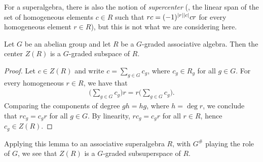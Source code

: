 \begin{remark}
    For a superalgebra, there is also the notion of \emph{supercenter} (\ie, the linear span of the set of homogeneous elements $c \in R$ such that $rc = (-1)^{|r||c|} cr$ for every homogeneous element $r \in R$), but this is not what we are considering here.
\end{remark}



\begin{lemma}\label{lemma:center-is-graded}
    Let $G$ be an abelian group and let $R$ be a $G$-graded associative algebra.
    Then the center $Z(R)$ is a $G$-graded subspace of $R$. 
\end{lemma}

\begin{proof}
    Let $c \in Z(R)$ and write $c = \sum_{g\in G} c_g$, where $c_g \in R_g$ for all $g \in G$.
    For every homogeneous $r \in R$, we have that
    \begin{align*}
        \big(\sum_{g\in G} c_g\big)r = r \big(\sum_{g\in G} c_g\big).
    \end{align*}
    Comparing the components of degree $gh = hg$, where $h = \deg r$, we conclude that $rc_g = c_g r$ for all $g \in G$. 
    By linearity, $r c_g = c_g r$ for all $r\in R$, hence $c_g \in Z(R)$.
\end{proof}

Applying this lemma to an associative superalgebra $R$, with $G^\#$ playing the role of $G$, we see that $Z(R)$ is a $G$-graded subsuperspace of $R$.


